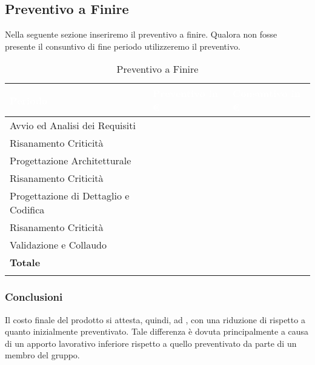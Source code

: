 \subsection{Preventivo a Finire}\label{caption_paf}

Nella seguente sezione inseriremo il preventivo a finire. Qualora non fosse presente il consuntivo di fine periodo utilizzeremo il preventivo. \\

\begin{longtable}{| C{.30\textwidth}| C{.15\textwidth}| C{.20\textwidth}|}
\hline
{}\textbf{\textcolor{white}{Periodo}} & \textbf{\textcolor{white}{Preventivo in \euro}} & \textbf{\textcolor{white}{Consuntivo in \euro}} \\
\hline
Avvio ed Analisi dei Requisiti &  &  \\
\hline
{}Risanamento Criticità &   &  \\
\hline
Progettazione Architetturale &  &  \\
\hline
{} Risanamento Criticità &  &  \\
\hline
Progettazione di Dettaglio e Codifica &  &  \\
\hline
{} Risanamento Criticità &   &  \\
\hline
Validazione e Collaudo &   &  \\
\hline
{}\textbf{Totale} &   & \textbf{}  \\
\hline
\caption{Preventivo a Finire}
\label{paf}
\end{longtable}

\subsubsection{Conclusioni}
Il costo finale del prodotto si attesta, quindi, ad , con una riduzione di  rispetto a quanto inizialmente preventivato. Tale differenza è dovuta principalmente a causa di un apporto lavorativo inferiore rispetto a quello preventivato da parte di un membro del gruppo. 